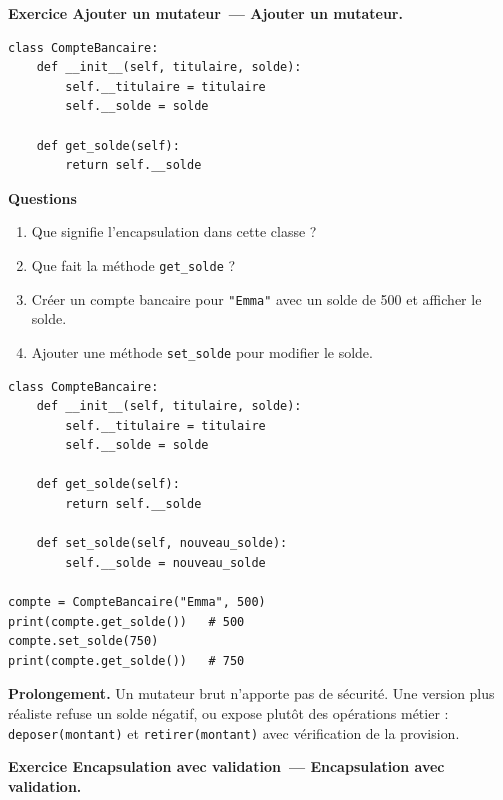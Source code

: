 \documentclass[11pt,a4paper]{article}
\newif\ifcorrige
\newcommand{\py}[1]{\texttt{#1}}
\newcounter{exo}[section]
\renewcommand{\theexo}{\arabic{exo}}
\newcommand{\exo}[2][]{%
  \Needspace{5cm}\stepcounter{exo}%
  \begin{quest}\textbf{Exercice \theexo\ifx\relax#1\relax\else\ — #1\fi.}
  \ifx\relax#2\relax\else\ #2\fi\end{quest}}
\newcommand{\rep}[1]{%
  \ifcorrige
    \par\smallskip{\color{corr}\small#1}\par\smallskip
  \else
    \par\nobreak\vspace{1mm}\noindent\color{black!55}\dotfill\par
    \noindent\color{black!55}\dotfill\par\color{black}\vspace{1mm}
  \fi}
\newcommand{\zonecode}[1][4cm]{%
  \ifcorrige\else
    \par\smallskip\noindent
    \begin{tcolorbox}[colback=white,colframe=black!45,boxrule=0.5pt,arc=1pt,height=#1]\end{tcolorbox}%
  \fi}
\newenvironment{solution}
  {\ifcorrige
     \begin{tcolorbox}[enhanced,breakable,colback=corrbg,colframe=corr,boxrule=0.6pt,arc=1pt,
       left=5pt,right=5pt,top=4pt,bottom=4pt,
       title={Corrigé},coltitle=corr,fonttitle=\bfseries\small,detach title,
       before upper={\tcbtitle\par\smallskip},fontupper=\small]%
   \else
     \setbox0\vbox\bgroup
   \fi}
  {\ifcorrige\end{tcolorbox}\else\egroup\fi}
\begin{document}
\exo[Ajouter un mutateur]{}

\begin{lstlisting}
class CompteBancaire:
    def __init__(self, titulaire, solde):
        self.__titulaire = titulaire
        self.__solde = solde

    def get_solde(self):
        return self.__solde
\end{lstlisting}

\textbf{Questions}
\begin{enumerate}
  \item Que signifie l'encapsulation dans cette classe ?
    \rep{Le titulaire et le solde sont privés : aucun code extérieur ne peut écrire
    \py{compte.__solde = 1000000}. Le solde ne peut être consulté que par \py{get_solde} et
    modifié que par les méthodes que la classe met à disposition.}
  \item Que fait la méthode \py{get_solde} ?
    \rep{Elle retourne la valeur de l'attribut privé \py{__solde} : c'est un accesseur en
    lecture seule.}
  \item Créer un compte bancaire pour \py{"Emma"} avec un solde de 500 et afficher le solde.
  \item Ajouter une méthode \py{set_solde} pour modifier le solde.
\end{enumerate}
\zonecode[5cm]
\begin{solution}
\begin{lstlisting}
class CompteBancaire:
    def __init__(self, titulaire, solde):
        self.__titulaire = titulaire
        self.__solde = solde

    def get_solde(self):
        return self.__solde

    def set_solde(self, nouveau_solde):
        self.__solde = nouveau_solde

compte = CompteBancaire("Emma", 500)
print(compte.get_solde())   # 500
compte.set_solde(750)
print(compte.get_solde())   # 750
\end{lstlisting}
\textbf{Prolongement.} Un mutateur brut n'apporte pas de sécurité. Une version plus réaliste
refuse un solde négatif, ou expose plutôt des opérations métier :
\py{deposer(montant)} et \py{retirer(montant)} avec vérification de la provision.
\end{solution}

\exo[Encapsulation avec validation]{}
\end{document}
